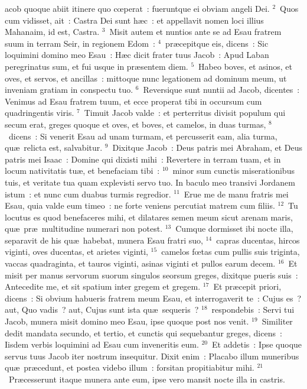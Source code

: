 \bchapter
{}acob quoque abiit itinere quo cœperat~: fueruntque ei obviam angeli Dei.
${}^{2}$~Quos cum vidisset, ait~: Castra Dei sunt h\ae c~: et appellavit nomen loci illius Mahanaim, id est, Castra.
${}^{3}$~Misit autem et nuntios ante se ad Esau fratrem suum in terram Seir, in regionem Edom~:
${}^{4}$~pr\ae cepitque eis, dicens~: Sic loquimini domino meo Esau~: H\ae c dicit frater tuus Jacob~: Apud Laban peregrinatus sum, et fui usque in pr\ae sentem diem.
${}^{5}$~Habeo boves, et asinos, et oves, et servos, et ancillas~: mittoque nunc legationem ad dominum meum, ut inveniam gratiam in conspectu tuo.
${}^{6}$~Reversique sunt nuntii ad Jacob, dicentes~: Venimus ad Esau fratrem tuum, et ecce properat tibi in occursum cum quadringentis viris.
${}^{7}$~Timuit Jacob valde~: et perterritus divisit populum qui secum erat, greges quoque et oves, et boves, et camelos, in duas turmas,
${}^{8}$~dicens~: Si venerit Esau ad unam turmam, et percusserit eam, alia turma, qu\ae\ relicta est, salvabitur.
${}^{9}$~Dixitque Jacob~: Deus patris mei Abraham, et Deus patris mei Isaac~: Domine qui dixisti mihi~: Revertere in terram tuam, et in locum nativitatis tu\ae , et benefaciam tibi~:
${}^{10}$~minor sum cunctis miserationibus tuis, et veritate tua quam explevisti servo tuo. In baculo meo transivi Jordanem istum~: et nunc cum duabus turmis regredior.
${}^{11}$~Erue me de manu fratris mei Esau, quia valde eum timeo~: ne forte veniens percutiat matrem cum filiis.
${}^{12}$~Tu locutus es quod benefaceres mihi, et dilatares semen meum sicut arenam maris, qu\ae\ pr\ae\ multitudine numerari non potest.
${}^{13}$~Cumque dormisset ibi nocte illa, separavit de his qu\ae\ habebat, munera Esau fratri suo,
${}^{14}$~capras ducentas, hircos viginti, oves ducentas, et arietes viginti,
${}^{15}$~camelos fœtas cum pullis suis triginta, vaccas quadraginta, et tauros viginti, asinas viginti et pullos earum decem.
${}^{16}$~Et misit per manus servorum suorum singulos seorsum greges, dixitque pueris suis~: Antecedite me, et sit spatium inter gregem et gregem.
${}^{17}$~Et pr\ae cepit priori, dicens~: Si obvium habueris fratrem meum Esau, et interrogaverit te~: Cujus es~? aut, Quo vadis~? aut, Cujus sunt ista qu\ae\ sequeris~?
${}^{18}$~respondebis~: Servi tui Jacob, munera misit domino meo Esau, ipse quoque post nos venit.
${}^{19}$~Similiter dedit mandata secundo, et tertio, et cunctis qui sequebantur greges, dicens~: Iisdem verbis loquimini ad Esau cum inveneritis eum.
${}^{20}$~Et addetis~: Ipse quoque servus tuus Jacob iter nostrum insequitur. Dixit enim~: Placabo illum muneribus qu\ae\ pr\ae cedunt, et postea videbo illum~: forsitan propitiabitur mihi.
${}^{21}$~Pr\ae cesserunt itaque munera ante eum, ipse vero mansit nocte illa in castris.


